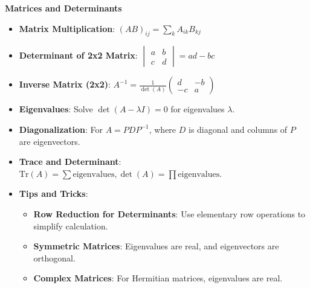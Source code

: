 \documentclass[a4paper,10pt]{article}
\begin{document}
\textbf{Matrices and Determinants}
\begin{itemize}
    \item \textbf{Matrix Multiplication}: \( (AB)_{ij} = \sum_k A_{ik}B_{kj} \)
    \item \textbf{Determinant of 2x2 Matrix}: \( \begin{vmatrix} a & b \\ c & d \end{vmatrix} = ad - bc \)
    \item \textbf{Inverse Matrix (2x2)}: \( A^{-1} = \frac{1}{\det(A)} \begin{pmatrix} d & -b \\ -c & a \end{pmatrix} \)
    \item \textbf{Eigenvalues}: Solve \( \det(A - \lambda I) = 0 \) for eigenvalues \( \lambda \).
    \item \textbf{Diagonalization}: For \( A = PDP^{-1} \), where \( D \) is diagonal and columns of \( P \) are eigenvectors.
    \item \textbf{Trace and Determinant}: \( \text{Tr}(A) = \sum \text{eigenvalues}, \det(A) = \prod \text{eigenvalues} \).
    \item \textbf{Tips and Tricks}:
    \begin{itemize}
        \item \textbf{Row Reduction for Determinants}: Use elementary row operations to simplify calculation.
        \item \textbf{Symmetric Matrices}: Eigenvalues are real, and eigenvectors are orthogonal.
        \item \textbf{Complex Matrices}: For Hermitian matrices, eigenvalues are real.
    \end{itemize}
\end{itemize}
\end{document}
